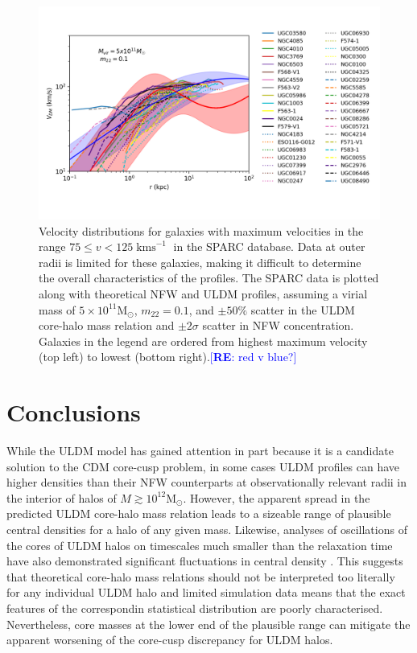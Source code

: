 \documentclass{pasa}%
\newcommand{\re}[1]{\textcolor{blue}{[{\bf RE}: #1]}}
\begin{document}
\begin{figure}[t]
\centering
\includegraphics[scale=0.9, trim={0.5cm 1cm 0cm 1cm}]{000_vs_SPARC_5_10_11.png}
\caption{Velocity distributions for galaxies with maximum velocities in the range $75 \leq v < 125\operatorname{kms}^{-1}$ in the SPARC database. Data at outer radii is limited for these galaxies, making it difficult to determine the overall characteristics of the profiles. The SPARC data is plotted along with theoretical NFW and ULDM profiles, assuming a virial mass of $5\times10^{11} \mathrm{M}_{\odot}$, $m_{22} = 0.1$, and $\pm 50 \%$ scatter in the ULDM core-halo mass relation and $\pm2\sigma$ scatter in NFW concentration. Galaxies in the legend are ordered from highest maximum velocity (top left) to lowest (bottom right).\re{red v blue?}}\label{fig:low_v}
\end{figure}



\section{Conclusions}\label{sec:conclusion}

While the ULDM model has gained attention in part because it is a candidate solution to  the CDM core-cusp problem, in some cases ULDM profiles can have higher densities than their NFW counterparts at observationally relevant radii in the interior of halos of $M \gtrsim 10^{12} \mathrm{M}_{\odot}$. However,  the apparent spread in the predicted ULDM core-halo mass relation \cite{Schive:2014hza} leads to a sizeable range of plausible central densities for a halo of any given mass. Likewise, analyses of oscillations of the cores of ULDM halos on timescales much smaller than the relaxation time have also demonstrated significant fluctuations in central density \cite{Veltmaat:2018dfz}. This suggests that theoretical core-halo mass relations should not be interpreted too literally for any individual ULDM halo and limited simulation data means that the exact features of the correspondin statistical distribution are poorly characterised. Nevertheless, core masses at the lower end of the plausible range can mitigate the apparent worsening of the core-cusp discrepancy for ULDM halos.  
\end{document}
